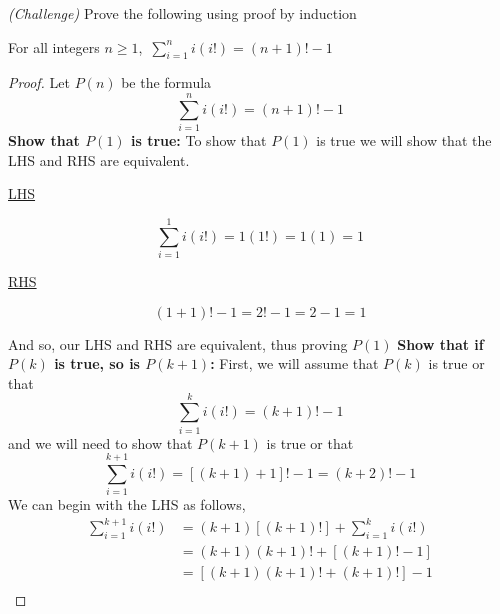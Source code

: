 \documentclass[addpoints]{exam}
\begin{document}
\begin{questions}
	\question \textit{(Challenge)} Prove the following using proof by induction
	\begin{center}
		For all integers $n \geq 1$, $\displaystyle\,\sum\limits_{i=1}^{n} i\left(i\textbf{!}\right) = (n+1)\textbf{!} - 1$
	\end{center}
	\begin{solution}[\stretch{1}]
		\begin{proof}
			Let $P(n)$ be the formula
			\[
				\sum\limits_{i=1}^{n} i\left(i\textbf{!}\right) = \left(n+1\right)\textbf{!} - 1
			\]
			\textbf{Show that $P(1)$ is true:} To show that $P(1)$ is true we will show that the LHS and RHS are equivalent.
			\newline
			\begin{minipage}[t]{0.45\linewidth}
				\begin{center}
					\underline{LHS}
				\end{center}
				\[
					\sum\limits_{i=1}^{1} i\left(i\textbf{!}\right) = 1(1\textbf{!}) = 1(1) = 1
				\]
			\end{minipage}
			\hfill
			\begin{minipage}[t]{0.45\linewidth}
				\begin{center}
					\underline{RHS}
				\end{center}
				\[
					\left(1+1\right)\textbf{!} - 1 = 2\textbf{!} - 1 = 2 - 1 = 1
				\]
			\end{minipage}
			\newline And so, our LHS and RHS are equivalent, thus proving $P(1)$
			\newline\textbf{Show that if $P(k)$ is true, so is $P(k+1)$:} First, we will assume that $P(k)$ is true or that
			\[
				\sum\limits_{i=1}^{k} i\left(i\textbf{!}\right) = \left(k+1\right)\textbf{!} - 1
			\]
			and we will need to show that $P(k+1)$ is true or that
			\[
				\sum\limits_{i=1}^{k+1} i\left(i\textbf{!}\right) = \left[\left(k+1\right)+1\right]\textbf{!}-1 = \left(k+2\right)\textbf{!} - 1
			\]
			We can begin with the LHS as follows,
			\begin{align*}
				\sum\limits_{i=1}^{k+1} i\left(i\textbf{!}\right) & = \left(k+1\right)\left[\left(k+1\right)\textbf{!}\right] + \sum\limits_{i=1}^{k} i\left(i\textbf{!}\right)                              \\
				                                                  & = \left(k+1\right)\left(k+1\right)\textbf{!} + \left[\left(k+1\right)\textbf{!} - 1\right]                                               \\
				                                                  & = \left[\left(k+1\right)\left(k+1\right)\textbf{!} + \left(k+1\right)\textbf{!}\right] - 1 \tag{by the associative property of addition} \\

\end{align*}
\end{proof}
\end{solution}
\end{questions}
\end{document}
